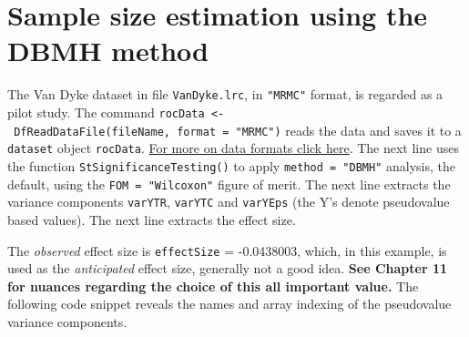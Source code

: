 \documentclass[
]{book}
\newenvironment{Shaded}{\begin{snugshade}}{\end{snugshade}}
\newcommand{\CommentTok}[1]{\textcolor[rgb]{0.56,0.35,0.01}{\textit{#1}}}
\newcommand{\DataTypeTok}[1]{\textcolor[rgb]{0.13,0.29,0.53}{#1}}
\newcommand{\FloatTok}[1]{\textcolor[rgb]{0.00,0.00,0.81}{#1}}
\newcommand{\KeywordTok}[1]{\textcolor[rgb]{0.13,0.29,0.53}{\textbf{#1}}}
\newcommand{\NormalTok}[1]{#1}
\newcommand{\OperatorTok}[1]{\textcolor[rgb]{0.81,0.36,0.00}{\textbf{#1}}}
\newcommand{\StringTok}[1]{\textcolor[rgb]{0.31,0.60,0.02}{#1}}
\begin{document}
\hypertarget{sample-size-estimation-using-the-dbmh-method}{%
\section{Sample size estimation using the DBMH method}\label{sample-size-estimation-using-the-dbmh-method}}

The Van Dyke dataset in file \texttt{VanDyke.lrc}, in \texttt{"MRMC"} format, is regarded as a pilot study. The command \texttt{rocData\ \textless{}-\ DfReadDataFile(fileName,\ format\ =\ "MRMC")} reads the data and saves it to a \texttt{dataset} object \texttt{rocData}. \href{https://dpc10ster.github.io/RJafroc/reference/RJafroc-package.html}{For more on data formats click here}. The next line uses the function \texttt{StSignificanceTesting()} to apply \texttt{method\ =\ "DBMH"} analysis, the default, using the \texttt{FOM\ =\ "Wilcoxon"} figure of merit. The next line extracts the variance components \texttt{varYTR}, \texttt{varYTC} and \texttt{varYEps} (the Y's denote pseudovalue based values). The next line extracts the effect size.

\begin{Shaded}
\end{Shaded}

The \emph{observed} effect size is \texttt{effectSize} = -0.0438003, which, in this example, is used as the \emph{anticipated} effect size, generally not a good idea. \textbf{See Chapter 11 for nuances regarding the choice of this all important value.} The following code snippet reveals the names and array indexing of the pseudovalue variance components.
\end{document}
